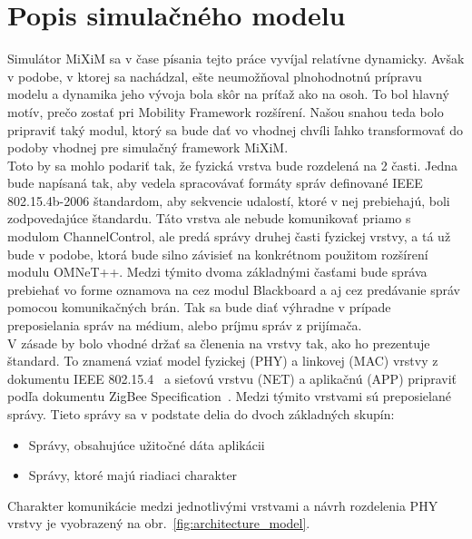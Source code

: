\chapter{Popis simulačného modelu}

\indent\indent Simulátor MiXiM sa v čase písania tejto práce vyvíjal relatívne dynamicky. Avšak v podobe, v ktorej sa nachádzal, ešte neumožňoval plnohodnotnú prípravu modelu a dynamika jeho vývoja bola skôr na príťaž ako na osoh. To bol hlavný motív, prečo zostať pri Mobility Framework rozšírení. Našou snahou teda bolo pripraviť taký modul, ktorý sa bude dať vo vhodnej chvíli ľahko transformovať do podoby vhodnej pre simulačný framework MiXiM.\\
\indent Toto by sa mohlo podariť tak, že fyzická vrstva bude rozdelená na 2 časti. Jedna bude napísaná tak, aby vedela spracovávať formáty správ definované IEEE 802.15.4b-2006 štandardom, aby sekvencie udalostí, ktoré v nej prebiehajú, boli zodpovedajúce štandardu. Táto vrstva ale nebude komunikovať priamo s modulom \ttfamily ChannelControl\rmfamily, ale predá správy druhej časti fyzickej vrstvy, a tá už bude v podobe, ktorá bude silno závisieť na konkrétnom použitom rozšírení modulu OMNeT++. Medzi týmito dvoma základnými časťami bude správa prebiehať vo forme oznamova na cez modul \ttfamily Blackboard \rmfamily a aj cez predávanie správ pomocou komunikačných brán. Tak sa bude diať výhradne v prípade preposielania správ na médium, alebo príjmu správ z prijímača.\\
\indent V zásade by bolo vhodné držať sa členenia na vrstvy tak, ako ho prezentuje štandard. To znamená vziať model fyzickej (PHY) a linkovej (MAC) vrstvy z dokumentu IEEE 802.15.4~\cite{ieee06} a sieťovú vrstvu (NET) a aplikačnú (APP) pripraviť podľa dokumentu ZigBee Specification~\cite{zigbee08}. Medzi týmito vrstvami sú preposielané správy. Tieto správy sa v podstate delia do dvoch základných skupín:\\
\begin{itemize}
 \item Správy, obsahujúce užitočné dáta aplikácii
 \item Správy, ktoré majú riadiaci charakter
\end{itemize}
\indent\indent Charakter komunikácie medzi jednotlivými vrstvami a návrh rozdelenia PHY vrstvy je vyobrazený na obr.~\ref{fig:architecture_model}.\\

